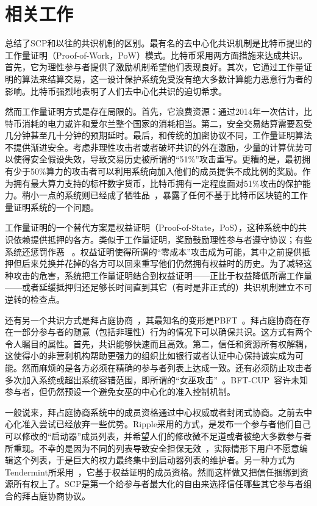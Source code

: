 \section{相关工作}

总结了SCP和以往的共识机制的区别。最有名的去中心化共识机制是比特币提出的工作量证明（Proof-of-Work，PoW）模式。比特币采用两方面措施来达成共识。首先，它为理性参与者提供了激励机制希望他们表现良好。其次，它通过工作量证明的算法来结算交易，这一设计保护系统免受没有绝大多数计算能力恶意行为者的影响。比特币强烈地表明了人们去中心化共识的迫切希求。

然而工作量证明方式是存在局限的。首先，它浪费资源：通过2014年一次估计，比特币消耗的电力或许和爱尔兰整个国家的消耗相当。第二，安全交易结算需要忍受几分钟甚至几十分钟的预期延时。最后，和传统的加密协议不同，工作量证明算法不提供渐进安全。考虑非理性攻击者或者破坏共识的外在激励，少量的计算优势可以使得安全假设失效，导致交易历史被所谓的``51\%''攻击重写。更糟的是，最初拥有少于50\%算力的攻击者可以利用系统向加入他们的成员提供不成比例的奖励。作为拥有最大算力支持的标杆数字货币，比特币拥有一定程度面对51\%攻击的保护能力。稍小一点的系统则已经成了牺牲品~\cite{attack_bbt2013,attack_cb2013}，暴露了任何不基于比特币区块链的工作量证明系统的一个问题。

工作量证明的一个替代方案是权益证明（Proof-of-State，PoS），这种系统中的共识依赖提供抵押的各方。类似于工作量证明，奖励鼓励理性参与者遵守协议；有些系统还惩罚作恶~\cite{slasher2014, neucoin2015} 。权益证明使得所谓的``零成本''攻击成为可能，其中之前提供抵押但后来兑换并花掉的各方可以回来重写他们仍然拥有权益时的历史。为了减轻这种攻击的危害，系统把工作量证明结合到权益证明——正比于权益降低所需工作量——或者延缓抵押归还足够长时间直到其它（有时是非正式的）共识机制建立不可逆转的检查点。

还有另一个共识方式是拜占庭协商~\cite{Pease:1980:RAP:322186.322188,Lamport:1982:BGP:357172.357176}，其最知名的变形是PBFT~\cite{Castro:1999:PBFT}。拜占庭协商在存在一部分参与者的随意（包括非理性）行为的情况下可以确保共识。这方式有两个令人瞩目的属性。首先，共识能够快速而且高效。第二，信任和资源所有权解耦，这使得小的非营利机构帮助更强力的组织比如银行或者认证中心保持诚实成为可能。然而麻烦的是各方必须在精确的参与者列表上达成一致。还有必须防止攻击者多次加入系统或超出系统容错范围，即所谓的``女巫攻击''~\cite{Douceur:2002:SA:646334.687813}。BFT-CUP~\cite{Alchieri:2008:BCU:1496310.1496316}容许未知参与者，但仍然预设一个避免女巫的中心化的准入控制机制。

一般说来，拜占庭协商系统中的成员资格通过中心权威或者封闭式协商。之前去中心化准入尝试已经放弃一些优势。Ripple采用的方式，是发布一个参与者他们自己可以修改的``启动器''成员列表，并希望人们的修改微不足道或者被绝大多数参与者所重现。不幸的是因为不同的列表导致安全担保无效~\cite{ripple2014}，实际情形下用户不愿意编辑这个列表，于是巨大的权力最终集中到启动器列表的维护者。另一种方式为Tendermint所采用~\cite{tendermint2014}，它基于权益证明的成员资格。然而这样做又把信任捆绑到资源所有权上了。SCP是第一个给参与者最大化的自由来选择信任哪些其它参与者组合的拜占庭协商协议。